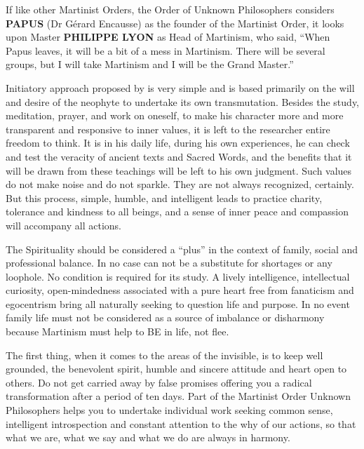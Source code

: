 If like other Martinist Orders, the Order of Unknown Philosophers considers \textbf{PAPUS} (Dr
Gérard Encausse) as the founder of the Martinist Order, it looks upon Master \textbf{PHILIPPE
LYON} as Head of Martinism, who said, ``When Papus leaves, it will be
a bit of a mess in Martinism. There will be several groups, but I will take Martinism and I
will be the Grand Master.''


Initiatory approach proposed by \moup{} is very simple
and is based primarily on the will and desire of the neophyte to undertake its own
transmutation. Besides the study, meditation, prayer, and work on oneself, to make his
character more and more transparent and responsive to inner values, it is left to the
researcher entire freedom to think. It is in his daily life, during his own experiences, he can
check and test the veracity of ancient texts and Sacred Words, and the benefits that it will
be drawn from these teachings will be left to his own judgment. Such values do not make
noise and do not sparkle. They are not always recognized, certainly. But this process,
simple, humble, and intelligent leads to practice charity, tolerance and kindness to all
beings, and a sense of inner peace and compassion will accompany all actions.


The Spirituality should be considered a ``plus'' in the context of family, social and
professional balance. In no case can not be a substitute for shortages or any loophole. No
condition is required for its study. A lively intelligence, intellectual curiosity, open-mindedness associated with a pure heart free from fanaticism and egocentrism bring all
naturally seeking to question life and purpose. In no event family life must not be
considered as a source of imbalance or disharmony because Martinism must help to BE in
life, not flee.


The first thing, when it comes to the areas of the invisible, is to keep well grounded, the
benevolent spirit, humble and sincere attitude and heart open to others. Do not get carried
away by false promises offering you a radical transformation after a period of ten days. Part
of the Martinist Order Unknown Philosophers helps you to undertake individual work
seeking common sense, intelligent introspection and constant attention to the why of our
actions, so that what we are, what we say and what we do are always in harmony.

